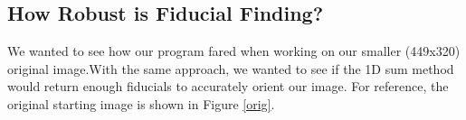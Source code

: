 \documentclass[10pt]{scrartcl}
\begin{document}
\subsection{How Robust is Fiducial Finding?} %
\label{sub:how_robust_is_fiducial_finding_}
    We wanted to see how our program fared when working on our smaller (449x320) original image.With the same approach, we wanted to see if the 1D sum method would return enough fiducials to accurately orient our image. For reference, the original starting image is shown in Figure \ref{orig}. 

\begin{figure}[!ht]
\end{figure}
\end{document}
